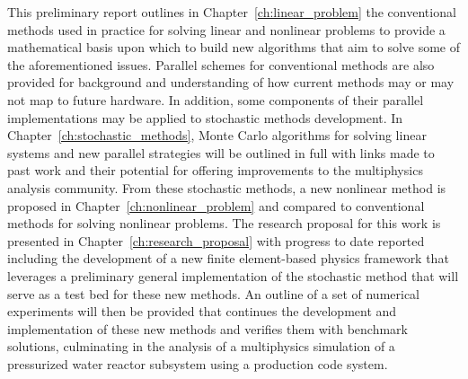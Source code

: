 This preliminary report outlines in Chapter~\ref{ch:linear_problem}
the conventional methods used in practice for solving linear and
nonlinear problems to provide a mathematical basis upon which to build
new algorithms that aim to solve some of the aforementioned
issues. Parallel schemes for conventional methods are also provided
for background and understanding of how current methods may or may not
map to future hardware. In addition, some components of their parallel
implementations may be applied to stochastic methods development. In
Chapter~\ref{ch:stochastic_methods}, Monte Carlo algorithms for
solving linear systems and new parallel strategies will be outlined in
full with links made to past work and their potential for offering
improvements to the multiphysics analysis community. From these
stochastic methods, a new nonlinear method is proposed in
Chapter~\ref{ch:nonlinear_problem} and compared to conventional
methods for solving nonlinear problems. The research proposal for this
work is presented in Chapter~\ref{ch:research_proposal} with progress
to date reported including the development of a new finite
element-based physics framework that leverages a preliminary general
implementation of the stochastic method that will serve as a test bed
for these new methods. An outline of a set of numerical experiments
will then be provided that continues the development and
implementation of these new methods and verifies them with benchmark
solutions, culminating in the analysis of a multiphysics simulation of
a pressurized water reactor subsystem using a production code system.
